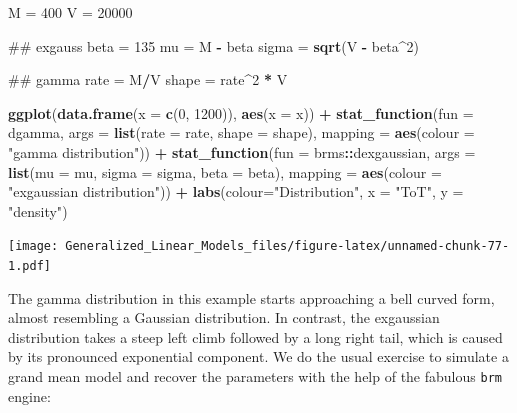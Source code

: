 \documentclass[]{svmono}
\newenvironment{Shaded}{\begin{snugshade}}{\end{snugshade}}
\newcommand{\KeywordTok}[1]{\textcolor[rgb]{0.13,0.29,0.53}{\textbf{#1}}}
\newcommand{\DataTypeTok}[1]{\textcolor[rgb]{0.13,0.29,0.53}{#1}}
\newcommand{\DecValTok}[1]{\textcolor[rgb]{0.00,0.00,0.81}{#1}}
\newcommand{\StringTok}[1]{\textcolor[rgb]{0.31,0.60,0.02}{#1}}
\newcommand{\OperatorTok}[1]{\textcolor[rgb]{0.81,0.36,0.00}{\textbf{#1}}}
\newcommand{\NormalTok}[1]{#1}
\theoremstyle{definition}
\theoremstyle{definition}
\theoremstyle{definition}
\theoremstyle{remark}
\begin{document}
\begin{Shaded}
\begin{Highlighting}[]
\NormalTok{M =}\StringTok{ }\DecValTok{400}
\NormalTok{V =}\StringTok{ }\DecValTok{20000}

\NormalTok{## exgauss}
\NormalTok{beta =}\StringTok{ }\DecValTok{135}
\NormalTok{mu =}\StringTok{ }\NormalTok{M }\OperatorTok{-}\StringTok{ }\NormalTok{beta}
\NormalTok{sigma =}\StringTok{ }\KeywordTok{sqrt}\NormalTok{(V }\OperatorTok{-}\StringTok{ }\NormalTok{beta}\OperatorTok{^}\DecValTok{2}\NormalTok{)}

\NormalTok{## gamma}
\NormalTok{rate =}\StringTok{ }\NormalTok{M}\OperatorTok{/}\NormalTok{V}
\NormalTok{shape =}\StringTok{ }\NormalTok{rate}\OperatorTok{^}\DecValTok{2} \OperatorTok{*}\StringTok{ }\NormalTok{V}

\KeywordTok{ggplot}\NormalTok{(}\KeywordTok{data.frame}\NormalTok{(}\DataTypeTok{x =} \KeywordTok{c}\NormalTok{(}\DecValTok{0}\NormalTok{, }\DecValTok{1200}\NormalTok{)), }\KeywordTok{aes}\NormalTok{(}\DataTypeTok{x =}\NormalTok{ x)) }\OperatorTok{+}
\StringTok{  }\KeywordTok{stat_function}\NormalTok{(}\DataTypeTok{fun =}\NormalTok{ dgamma, }
                \DataTypeTok{args =} \KeywordTok{list}\NormalTok{(}\DataTypeTok{rate =}\NormalTok{ rate, }\DataTypeTok{shape =}\NormalTok{ shape), }
                \DataTypeTok{mapping =} \KeywordTok{aes}\NormalTok{(}\DataTypeTok{colour =} \StringTok{"gamma distribution"}\NormalTok{)) }\OperatorTok{+}
\StringTok{  }\KeywordTok{stat_function}\NormalTok{(}\DataTypeTok{fun =}\NormalTok{ brms}\OperatorTok{::}\NormalTok{dexgaussian, }
                \DataTypeTok{args =} \KeywordTok{list}\NormalTok{(}\DataTypeTok{mu =}\NormalTok{ mu, }
                            \DataTypeTok{sigma =}\NormalTok{ sigma,}
                            \DataTypeTok{beta =}\NormalTok{ beta), }
                \DataTypeTok{mapping =} \KeywordTok{aes}\NormalTok{(}\DataTypeTok{colour =} \StringTok{"exgaussian distribution"}\NormalTok{)) }\OperatorTok{+}
\StringTok{  }\KeywordTok{labs}\NormalTok{(}\DataTypeTok{colour=}\StringTok{"Distribution"}\NormalTok{, }\DataTypeTok{x =} \StringTok{"ToT"}\NormalTok{, }\DataTypeTok{y =} \StringTok{"density"}\NormalTok{)}
\end{Highlighting}
\end{Shaded}

\texttt{[image: Generalized\_Linear\_Models\_files/figure-latex/unnamed-chunk-77-1.pdf]}

The gamma distribution in this example starts approaching a bell curved
form, almost resembling a Gaussian distribution. In contrast, the
exgaussian distribution takes a steep left climb followed by a long
right tail, which is caused by its pronounced exponential component. We
do the usual exercise to simulate a grand mean model and recover the
parameters with the help of the fabulous \texttt{brm} engine:
\end{document}
